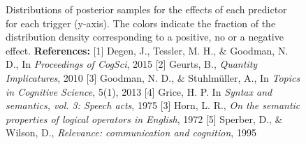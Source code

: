 \documentclass[11pt,letterpaper]{article}
\begin{document}
\begin{figure}   
    \caption{Distributions of posterior samples for the effects of each predictor for each trigger (y-axis). The colors indicate the fraction of the distribution density corresponding to a positive, no or a negative effect. \newline \textbf{References:} [1] Degen, J., Tessler, M. H., \& Goodman, N. D., In \textit{Proceedings of CogSci}, 2015 [2] Geurts, B., \textit{Quantity Implicatures}, 2010 [3] Goodman, N. D., \& Stuhlm\"uller, A., In \textit{Topics in Cognitive Science}, 5(1), 2013 [4] Grice, H. P. In \textit{Syntax and semantics, vol. 3: Speech acts}, 1975 [3] Horn, L. R., \textit{On the semantic properties of logical operators in English}, 1972 [5] Sperber, D., \& Wilson, D., \textit{Relevance: communication and cognition}, 1995  
    }
    \label{posteriors}
\end{figure}


\newpage

\end{document}
